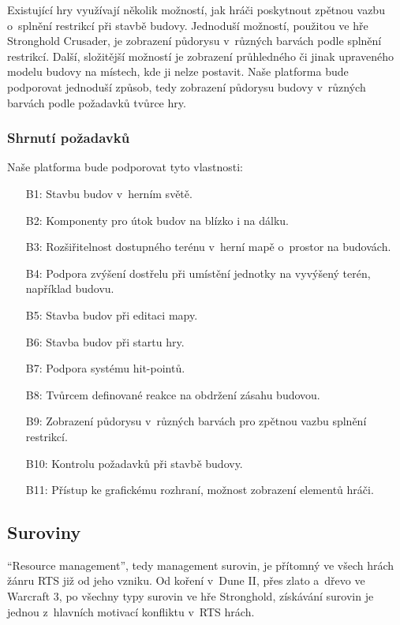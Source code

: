 Existující hry využívají několik možností, jak hráči poskytnout zpětnou vazbu o~splnění restrikcí při stavbě budovy. Jednoduší možností, použitou ve hře Stronghold Crusader\citep{site:strongholdcrus}, je zobrazení půdorysu v~různých barvách podle splnění restrikcí. Další, složitější možností je zobrazení průhledného či jinak upraveného modelu budovy na místech, kde ji nelze postavit.  Naše platforma bude podporovat jednoduší způsob, tedy zobrazení půdorysu budovy v~různých barvách podle požadavků tvůrce hry.

\subsubsection{Shrnutí požadavků}

Naše platforma bude podporovat tyto vlastnosti:
\begin{itemize}
	\item[B1:] Stavbu budov v~herním světě.
	\item[B2:] Komponenty pro útok budov na blízko i na dálku.
	\item[B3:] Rozšiřitelnost dostupného terénu v~herní mapě o~prostor na budovách.
	\item[B4:] Podpora zvýšení dostřelu při umístění jednotky na vyvýšený terén, například budovu.
	\item[B5:] Stavba budov při editaci mapy.
	\item[B6:] Stavba budov při startu hry.
	\item[B7:] Podpora systému hit-pointů.
	\item[B8:] Tvůrcem definované reakce na obdržení zásahu budovou.
	\item[B9:] Zobrazení půdorysu v~různých barvách pro zpětnou vazbu splnění restrikcí.
	\item[B10:] Kontrolu požadavků při stavbě budovy.
	\item[B11:] Přístup ke grafickému rozhraní, možnost zobrazení elementů hráči.
\end{itemize}


\subsection{Suroviny}
\label{sec:suroviny}
``Resource management'', tedy management surovin, je přítomný ve všech hrách žánru RTS již od jeho vzniku. Od koření v~Dune II, přes zlato a~dřevo ve Warcraft 3\citep{site:warcraft3}, po všechny typy surovin ve hře Stronghold\citep{site:strongholdcrus}, získávání surovin je jednou z~hlavních motivací konfliktu v~RTS hrách. 

